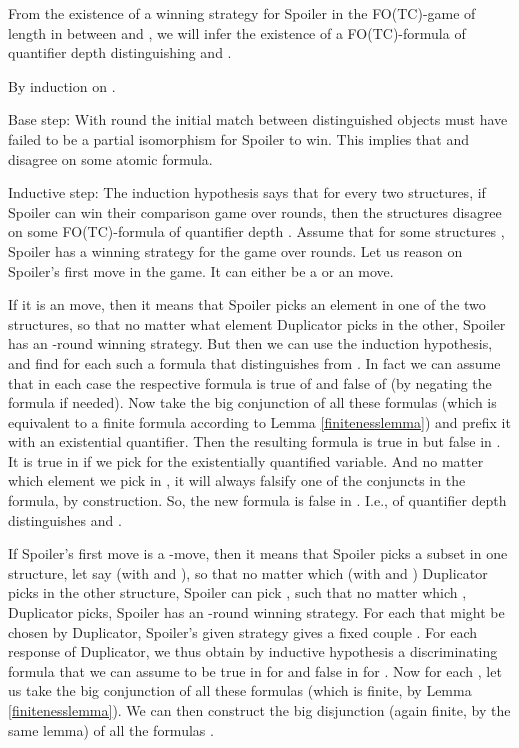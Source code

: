 \documentclass{LMCS}
\newcommand{\fotc}{\textsf{FO(TC)}\xspace}
\begin{document}
\begin{iteMize}{}

\item From the existence of a winning strategy for
Spoiler in the \fotc-game of length  in between  and , we will infer the
existence of a \fotc-formula of quantifier depth 
distinguishing  and .

By induction on .

Base step: With  round the initial match between distinguished objects must have failed to be a partial isomorphism for Spoiler to win. This
implies that  and  disagree on some atomic formula.

Inductive step: The induction hypothesis says that for every two
structures, if Spoiler can win their comparison game over  rounds,
then the structures disagree on some \fotc-formula of quantifier depth
.  Assume that for some structures , Spoiler has a winning strategy for the game over 
rounds. Let us reason on Spoiler's first move in the game. It can
either be a  or an  move.

If it is an  move, then it means that Spoiler picks an
element  in one of the two structures, so that no matter what
element  Duplicator picks in the other, Spoiler has an
-round winning strategy. But then we can use the induction
hypothesis, and find for each such  a formula 
that distinguishes  from .
In fact we can assume that in each case the respective formula is
true of  and false of  (by
negating the formula if needed). Now take the big conjunction
 of all these formulas (which is equivalent to a
finite formula according to Lemma \ref{finitenesslemma}) and prefix it
with an existential quantifier. Then the resulting formula is true
in  but false in . It is true in
 if we pick  for the existentially quantified
variable. And no matter which element we pick in , it will always falsify one of the conjuncts in the
formula, by construction. So, the new formula is false in . I.e.,  of quantifier depth 
distinguishes  and .


If Spoiler's first move is a -move, then it means that
Spoiler picks a subset in one structure, let say  (with  and ), so that
no matter which  (with  and ) Duplicator picks in the other structure, Spoiler can
pick ,  such that no matter which
,  Duplicator picks, Spoiler has an
-round winning strategy. For each  that might be chosen by
Duplicator, Spoiler's given strategy gives a fixed couple
. For each response  of Duplicator, we
thus obtain by inductive hypothesis a discriminating formula
 that we can assume to be true in
 for  and false in 
for . Now for each , let us take the big
conjunction  of all these formulas (which is finite,
by Lemma \ref{finitenesslemma}). We can then construct the big
disjunction  (again finite, by the same lemma) of all
the formulas .


\end{iteMize}
\end{document}
